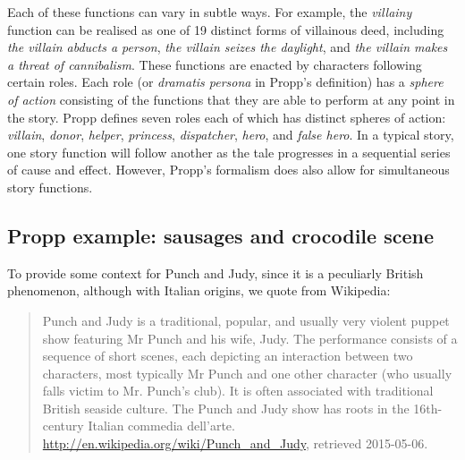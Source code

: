 \documentclass{llncs}
\begin{document}
Each of these functions can vary in subtle ways. For example, the \emph{villainy} function can be realised as one of 19 distinct forms of villainous deed, including \emph{the villain abducts a person}, \emph{the villain seizes the daylight}, and \emph{the villain makes a threat of cannibalism}.
These functions are enacted by characters following certain roles. Each role (or \emph{dramatis persona} in Propp's definition) has a \emph{sphere of action} consisting of the functions that they are able to perform at any point in the story. Propp defines seven roles each of which has distinct spheres of action: \emph{villain}, \emph{donor}, \emph{helper}, \emph{princess}, \emph{dispatcher}, \emph{hero}, and \emph{false hero}.
In a typical story, one story function will follow another as the tale progresses in a sequential series of cause and effect. However, Propp's formalism does also allow for simultaneous story functions.

\subsection{Propp example: sausages and crocodile scene}\label{sec:pjexample}
To provide some context for Punch and Judy, since it is a peculiarly British phenomenon, although with Italian origins, we quote from Wikipedia:
\begin{quote}\small
Punch and Judy is a traditional, popular, and usually very violent puppet show featuring Mr Punch and his wife, Judy. The performance consists of a sequence of short scenes, each depicting an interaction between two characters, most typically Mr Punch and one other character (who usually falls victim to Mr. Punch's club). It is often associated with traditional British seaside culture.
The Punch and Judy show has roots in the 16th-century Italian commedia dell'arte. \\
\hfill{\footnotesize
\url{http://en.wikipedia.org/wiki/Punch_and_Judy}, retrieved 2015-05-06.}
\end{quote}
\end{document}
